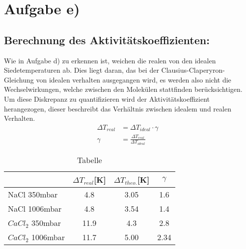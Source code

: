 \section{Aufgabe e)}
\subsection{Berechnung des Aktivitätskoeffizienten:}
Wie in Aufgabe d) zu erkennen ist, weichen die realen von den idealen
Siedetemperaturen ab. Dies liegt daran, das bei der Clausius-Claperyron-Gleichung von idealen verhalten
ausgegangen wird, es werden also nicht die Wechselwirkungen, welche zwischen den Molekülen stattfinden berücksichtigen.
Um diese Diskrepanz zu quantifizieren wird der Aktivitätskoeffizient herangezogen, dieser beschreibt das Verhältnis
zwischen idealem und realen Verhalten.
\begin{align*}
	\Delta T_{real} & = \Delta T_{ideal} \cdot \gamma            \\
	\gamma          & = \frac{\Delta T_{real}}{\Delta T_{ideal}}
\end{align*}

\begin{table}[H]
	\centering
	\caption{Tabelle}
	\begin{tabular}{lccc}
		\toprule
		                  & $\Delta T_{real}$[K] & $\Delta T_{theo.}$[K] & $\gamma$ \\
		\midrule
		NaCl 350mbar      & 4.8                  & 3.05                  & 1.6      \\
		NaCl 1006mbar     & 4.8                  & 3.54                  & 1.4      \\
		$CaCl_2$ 350mbar  & 11.9                 & 4.3                   & 2.8      \\
		$CaCl_2$ 1006mbar & 11.7                 & 5.00                  & 2.34     \\
		\bottomrule
	\end{tabular}
\end{table}
 